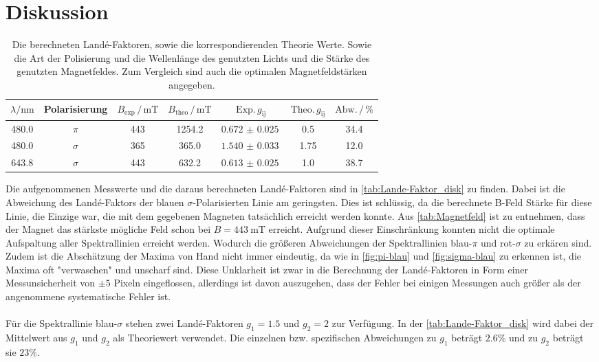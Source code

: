 \section{Diskussion}
\label{sec:Diskussion}
\begin{table}
    \caption{Die berechneten Landé-Faktoren, sowie die korrespondierenden Theorie Werte. Sowie die Art der Polisierung und die Wellenlänge des genutzten Lichts und die Stärke des genutzten Magnetfeldes. Zum Vergleich sind auch die optimalen Magnetfeldstärken angegeben.}
    \begin{tabular}{ccccccc}
        \toprule
        $\lambda / \si{\nano\meter}$ & Polarisierung & $B_\text{exp} \, /\, \si{\milli\tesla}$ &$B_\text{theo} \,/ \,\si{\milli\tesla}$& $\text{Exp.}\,g_\text{ij}$ & $\text{Theo.}\, g _\text{ij}$ & $\text{Abw.}\,/\,\%$\\
        \midrule
        480.0 & $\pi$    & 443 &  1254.2& $\SI{0.672(25)}{}$  & 0.5   &   34.4\\
        480.0 & $\sigma$ & 365 &  365.0 & $\SI{1.540(33)}{}$  & 1.75  &    12.0\\
        643.8 & $\sigma$ & 443 &  632.2 & $\SI{0.613(25)}{}$  & 1.0   &   38.7\\
        \bottomrule
    \end{tabular}
    \label{tab:Lande-Faktor_disk}
\end{table}
Die aufgenommenen Messwerte und die daraus berechneten Landé-Faktoren sind in \autoref{tab:Lande-Faktor_disk} zu finden.
Dabei ist die Abweichung des Landé-Faktors der blauen $\sigma$-Polarisierten Linie am geringsten.
Dies ist schlüssig, da die berechnete B-Feld Stärke für diese Linie, die Einzige war, die mit dem gegebenen Magneten tatsächlich erreicht werden konnte.
Aus \autoref{tab:Magnetfeld} ist zu entnehmen, dass der Magnet das stärkste mögliche Feld schon bei $B = \SI{443}{\milli\tesla}$ erreicht.
Aufgrund dieser Einschränkung konnten nicht die optimale Aufspaltung aller Spektrallinien erreicht werden.
Wodurch die größeren Abweichungen der Spektrallinien blau-$\pi$ und rot-$\sigma$ zu erkären sind.
Zudem ist die Abschätzung der Maxima von Hand nicht immer eindeutig, da wie in \autoref{fig:pi-blau} und \autoref{fig:sigma-blau} zu erkennen ist, die Maxima oft "verwaschen" und unscharf sind.
Diese Unklarheit ist zwar in die Berechnung der Landé-Faktoren in Form einer Messunsicherheit von $\pm 5$ Pixeln eingeflossen, allerdings ist davon auszugehen, dass der Fehler bei einigen Messungen auch größer als der angenommene systematische Fehler ist.
\\\\
Für die Spektrallinie blau-$\sigma$ stehen zwei Landé-Faktoren $g_1 = 1.5$ und $g_2 = 2$ zur Verfügung.
In der \autoref{tab:Lande-Faktor_disk} wird dabei der Mittelwert aus $g_1$ und $g_2$ als Theoriewert verwendet.
Die einzelnen bzw. spezifischen Abweichungen zu $g_1$ beträgt $2.6\%$ und zu $g_2$ beträgt sie $23\%$.

